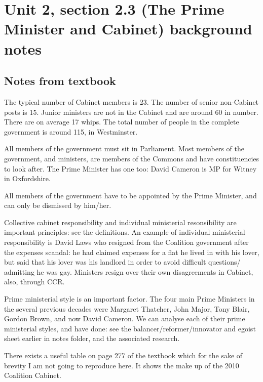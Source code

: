 \documentclass[11pt]{article}
\begin{document}
\section*{Unit  2, section 2.3 (The Prime Minister and Cabinet) background notes}

\subsection*{Notes from textbook}

The typical number of Cabinet members is 23.  The number of senior
non-Cabinet posts is 15.  Junior ministers are not in the Cabinet and are
around 60 in number.  There are on average 17 whips.  The total number of
people in the complete government is around 115, in Westminster.

All members of the government must sit in Parliament.  Most members of the
government, and ministers, are members of the Commons and have
constituencies to look after.  The Prime Minister has one too: David
Cameron is MP for Witney in Oxfordshire.

All members of the government have to be appointed by the Prime Minister,
and can only be dismissed by him\slash her.

Collective cabinet responsibility and individual ministerial resonsibility
are important principles: see the definitions.  An example of individual
ministerial responsibility is David Laws who
resigned from the Coalition government after the expenses scandal: he had
claimed expenses for a flat he lived in with his lover, but said that his
lover was his landlord in order to avoid difficult questions\slash
admitting he was gay.  Ministers resign over their own disagreements in
Cabinet, also, through CCR.

Prime ministerial style is an important factor.  The four main Prime
Ministers in the several previous decades were Margaret Thatcher, John
Major, Tony Blair, Gordon Brown, and now David Cameron.  We can analyse
each of their prime ministerial styles, and have done: see the
balancer\slash reformer\slash innovator and egoist sheet earlier in notes
folder, and the associated research.

There exists a useful table on page 277 of the textbook which for the sake
of brevity I am not going to reproduce here.  It shows the make up of the
2010 Coalition Cabinet.
\end{document}
